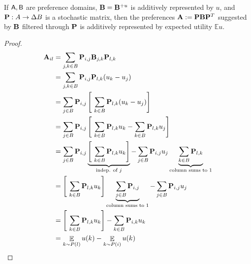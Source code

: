 \documentclass{article}
\begin{document}
	\vspace{1.5em}	


	\begin{prop}
		If $\sf A, B$ are preference domains, $\mathbf B = \mathbf B^{+u}$ is additively represented by $u$, and $\mathbf P : A \to \Delta B$ is a stochastic matrix, then the preferences $\mathbf A := \mathbf P \mathbf B \mathbf P^T$ suggested by $\mathbf B$ filtered through $\mathbf P$ is additively represented by expected utility $\mathbb E u$.
	\end{prop}
	\begin{proof}
		\begin{align*}
			\mathbf A_{il} &= \sum_{j,k \in B} \mathbf P_{i,j} \mathbf B_{j,k} \mathbf P_{l,k} \\
				&= \sum_{j,k \in B} \mathbf P_{i,j}  \mathbf P_{l,k} (u_k - u_j) \\
				&= \sum_{j \in B} \mathbf P_{i,j} \left[ ~\sum_{k \in B} \mathbf P_{l,k} (u_k - u_j)\right]\\
				&= \sum_{j \in B} \mathbf P_{i,j} \left[ ~\sum_{k \in B} \mathbf P_{l,k} u_k - \sum_{k \in B} \mathbf P_{l,k} u_j \right] \\
				&= \sum_{j \in B} \mathbf P_{i,j} \underbrace{\left[ ~\sum_{k \in B} \mathbf P_{l,k} u_k  \right]}_{\text{indep. of $j$}} -  \sum_{j \in B} \mathbf P_{i,j} u_j \underbrace{\sum_{k \in B} \mathbf P_{l,k}}_{\text{column sums to 1}} \\
				&= \left[ ~\sum_{k \in B} \mathbf P_{l,k} u_k  \right] \underbrace{\sum_{j \in B} \mathbf P_{i,j}}_{\text{column sums to 1}} -  \sum_{j \in B} \mathbf P_{i,j} u_j \\
				&= \left[ ~\sum_{k \in B} \mathbf P_{l,k} u_k  \right]  -  \sum_{k \in B} \mathbf P_{i,k} u_k \\
				&= \mathop{\mathbb E}\limits_{k \sim P(l)} u(k) - \mathop{\mathbb E}\limits_{k \sim P(i)} u(k)
		\end{align*}
	\end{proof}
\end{document}
